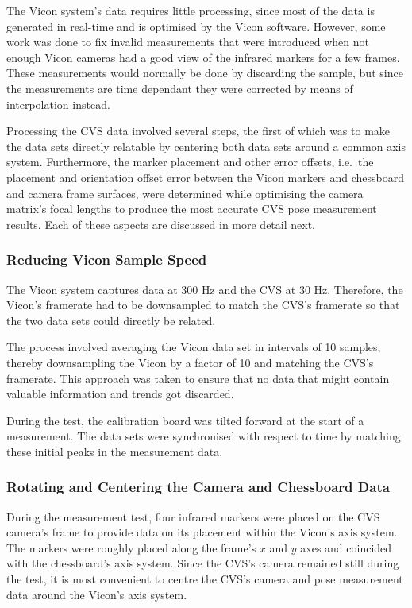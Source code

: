 The Vicon system's data requires little processing, since most of the data is generated in real-time and is optimised by the Vicon software. However, some work was done to fix invalid measurements that were introduced when not enough Vicon cameras had a good view of the infrared markers for a few frames. These measurements would normally be done by discarding the sample, but since the measurements are time dependant they were corrected by means of interpolation instead.

Processing the CVS data involved several steps, the first of which was to make the data sets directly relatable by centering both data sets around a common axis system. Furthermore, the marker placement and other error offsets, i.e.\ the placement and orientation offset error between the Vicon markers and chessboard and camera frame surfaces, were determined while optimising the camera matrix's focal lengths to produce the most accurate CVS pose measurement results. Each of these aspects are discussed in more detail next.

\subsubsection{Reducing Vicon Sample Speed}

The Vicon system captures data at 300 Hz and the CVS at 30 Hz. Therefore, the Vicon's framerate had to be downsampled to match the CVS's framerate so that the two data sets could directly be related. 

The process involved averaging the Vicon data set in intervals of 10 samples, thereby downsampling the Vicon by a factor of 10 and matching the CVS's framerate. This approach was taken to ensure that no data that might contain valuable information and trends got discarded.

During the test, the calibration board was tilted forward at the start of a measurement. The data sets were synchronised with respect to time by matching these initial peaks in the measurement data. 

\subsubsection{Rotating and Centering the Camera and Chessboard Data}
\label{sec:rotate-axes}

During the measurement test, four infrared markers were placed on the CVS camera's frame to provide data on its placement within the Vicon's axis system. The markers were roughly placed along the frame's $x$ and $y$ axes and coincided with the chessboard's axis system. Since the CVS's camera remained still during the test, it is most convenient to centre the CVS's camera and pose measurement data around the Vicon's axis system. 

